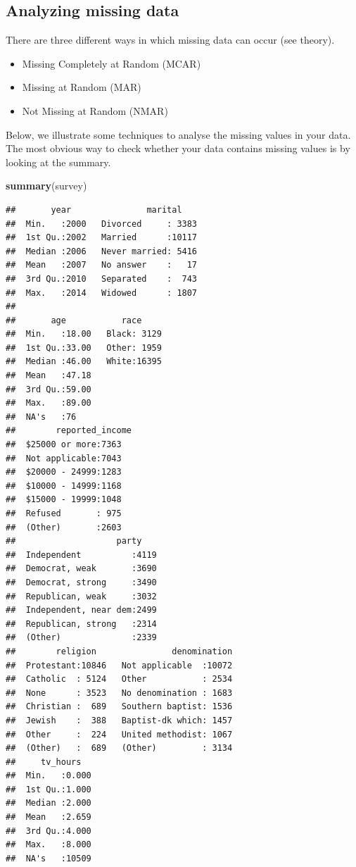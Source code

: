 \documentclass[]{tufte-book}
\newenvironment{Shaded}{}{}
\newcommand{\KeywordTok}[1]{\textcolor[rgb]{0.00,0.44,0.13}{\textbf{#1}}}
\newcommand{\NormalTok}[1]{#1}
\providecommand{\tightlist}{%
  \setlength{\itemsep}{0pt}\setlength{\parskip}{0pt}}
\begin{document}
\subsection{Analyzing missing data}\label{analyzing-missing-data}

There are three different ways in which missing data can occur (see
theory).

\begin{itemize}
\tightlist
\item
  Missing Completely at Random (MCAR)
\item
  Missing at Random (MAR)
\item
  Not Missing at Random (NMAR)
\end{itemize}

Below, we illustrate some techniques to analyse the missing values in
your data. The most obvious way to check whether your data contains
missing values is by looking at the summary.

\begin{Shaded}
\begin{Highlighting}[]
\KeywordTok{summary}\NormalTok{(survey)}
\end{Highlighting}
\end{Shaded}

\begin{verbatim}
##       year               marital     
##  Min.   :2000   Divorced     : 3383  
##  1st Qu.:2002   Married      :10117  
##  Median :2006   Never married: 5416  
##  Mean   :2007   No answer    :   17  
##  3rd Qu.:2010   Separated    :  743  
##  Max.   :2014   Widowed      : 1807  
##                                      
##       age           race      
##  Min.   :18.00   Black: 3129  
##  1st Qu.:33.00   Other: 1959  
##  Median :46.00   White:16395  
##  Mean   :47.18                
##  3rd Qu.:59.00                
##  Max.   :89.00                
##  NA's   :76                   
##        reported_income
##  $25000 or more:7363  
##  Not applicable:7043  
##  $20000 - 24999:1283  
##  $10000 - 14999:1168  
##  $15000 - 19999:1048  
##  Refused       : 975  
##  (Other)       :2603  
##                    party     
##  Independent          :4119  
##  Democrat, weak       :3690  
##  Democrat, strong     :3490  
##  Republican, weak     :3032  
##  Independent, near dem:2499  
##  Republican, strong   :2314  
##  (Other)              :2339  
##        religion               denomination  
##  Protestant:10846   Not applicable  :10072  
##  Catholic  : 5124   Other           : 2534  
##  None      : 3523   No denomination : 1683  
##  Christian :  689   Southern baptist: 1536  
##  Jewish    :  388   Baptist-dk which: 1457  
##  Other     :  224   United methodist: 1067  
##  (Other)   :  689   (Other)         : 3134  
##     tv_hours    
##  Min.   :0.000  
##  1st Qu.:1.000  
##  Median :2.000  
##  Mean   :2.659  
##  3rd Qu.:4.000  
##  Max.   :8.000  
##  NA's   :10509
\end{verbatim}
\end{document}
